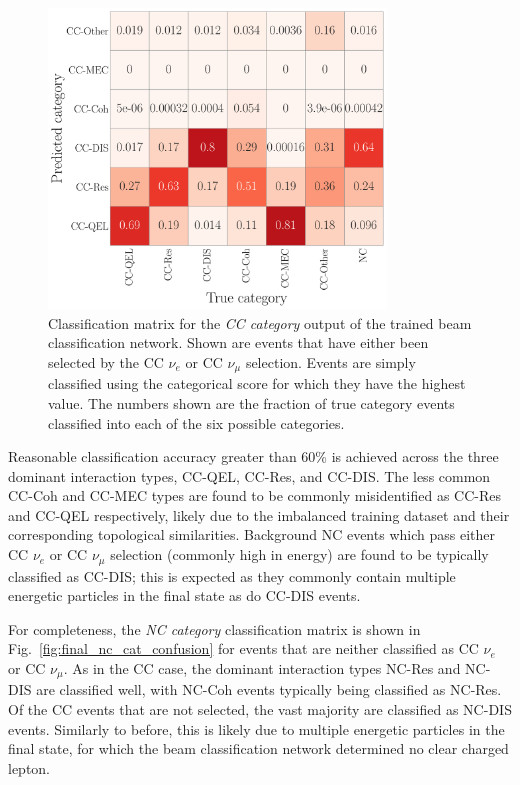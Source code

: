 \begin{figure} %
    \includegraphics[width=0.8\textwidth]{diagrams/7-results/final_cc_cat_confusion.pdf}
    \caption[Classification matrix for the CC category output of the beam classification network]
    {Classification matrix for the \emph{CC category} output of the trained beam classification
        network. Shown are events that have either been selected by the CC $\nu_{e}$ or CC
        $\nu_{\mu}$ selection. Events are simply classified using the categorical score for which
        they have the highest value. The numbers shown are the fraction of true category events
        classified into each of the six possible categories.}
    \label{fig:final_cc_cat_confusion}
\end{figure}

Reasonable classification accuracy greater than 60\% is achieved across the three dominant
interaction types, CC-QEL, CC-Res, and CC-DIS. The less common CC-Coh and CC-MEC types are found
to be commonly misidentified as CC-Res and CC-QEL respectively, likely due to the imbalanced
training dataset and their corresponding topological similarities. Background NC events which pass
either CC $\nu_{e}$ or CC $\nu_{\mu}$ selection (commonly high in energy) are found to be
typically classified as CC-DIS; this is expected as they commonly contain multiple energetic
particles in the final state as do CC-DIS events.

For completeness, the \emph{NC category} classification matrix is shown in
Fig.~\ref{fig:final_nc_cat_confusion} for events that are neither classified as CC $\nu_{e}$ or CC
$\nu_{\mu}$. As in the CC case, the dominant interaction types NC-Res and NC-DIS are classified
well, with NC-Coh events typically being classified as NC-Res. Of the CC events that are not
selected, the vast majority are classified as NC-DIS events. Similarly to before, this is likely
due to multiple energetic particles in the final state, for which the beam classification network
determined no clear charged lepton.

